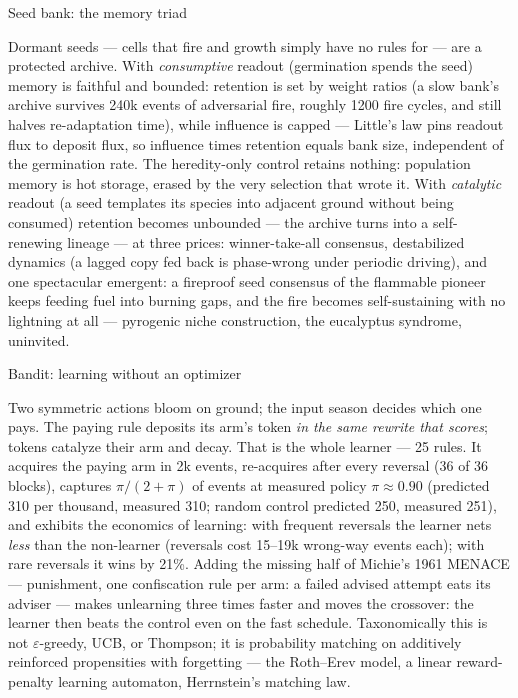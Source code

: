 \secc Seed bank: the memory triad

Dormant seeds --- cells that fire and growth simply have no rules
for --- are a protected archive. With {\it consumptive} readout
(germination spends the seed) memory is faithful and bounded:
retention is set by weight ratios (a slow bank's archive survives
240k events of adversarial fire, roughly 1200 fire cycles, and still
halves re-adaptation time), while influence is capped --- Little's
law pins readout flux to deposit flux, so influence times retention
equals bank size, independent of the germination rate. The
heredity-only control retains nothing: population memory is hot
storage, erased by the very selection that wrote it. With {\it
catalytic} readout (a seed templates its species into adjacent
ground without being consumed) retention becomes unbounded --- the
archive turns into a self-renewing lineage --- at three prices:
winner-take-all consensus, destabilized dynamics (a lagged copy fed
back is phase-wrong under periodic driving), and one spectacular
emergent: a fireproof seed consensus of the flammable pioneer keeps
feeding fuel into burning gaps, and the fire becomes self-sustaining
with no lightning at all --- pyrogenic niche construction, the
eucalyptus syndrome, uninvited.
\hfil\break{}

\secc Bandit: learning without an optimizer

Two symmetric actions bloom on ground; the input season decides
which one pays. The paying rule deposits its arm's token {\it in the
same rewrite that scores}; tokens catalyze their arm and decay. That
is the whole learner --- 25 rules. It acquires the paying arm in 2k
events, re-acquires after every reversal (36 of 36 blocks), captures
$\pi/(2{+}\pi)$ of events at measured policy $\pi{\approx}0.90$
(predicted 310 per thousand, measured 310; random control predicted
250, measured 251), and exhibits the economics of learning: with
frequent reversals the learner nets {\it less} than the non-learner
(reversals cost 15--19k wrong-way events each); with rare reversals
it wins by 21\%. Adding the missing half of Michie's 1961 MENACE ---
punishment, one confiscation rule per arm: a failed advised attempt
eats its adviser --- makes unlearning three times faster and moves
the crossover: the learner then beats the control even on the fast
schedule. Taxonomically this is not $\varepsilon$-greedy, UCB, or
Thompson; it is probability matching on additively reinforced
propensities with forgetting --- the Roth--Erev model, a linear
reward-penalty learning automaton, Herrnstein's matching law.
\hfil\break{}

